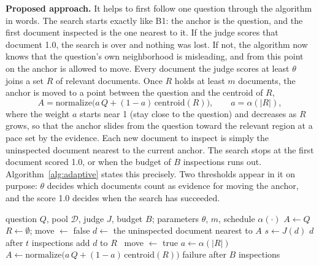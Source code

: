 \documentclass[12pt,a4paper]{article}
\begin{document}
\textbf{Proposed approach.} It helps to first follow one question through the algorithm in words. The search starts exactly like B1: the anchor is the question, and the first document inspected is the one nearest to it. If the judge scores that document 1.0, the search is over and nothing was lost. If not, the algorithm now knows that the question's own neighborhood is misleading, and from this point on the anchor is allowed to move. Every document the judge scores at least $\theta$ joins a set $R$ of relevant documents. Once $R$ holds at least $m$ documents, the anchor is moved to a point between the question and the centroid of $R$,
\begin{equation}
  A = \mathrm{normalize}\bigl(a\,Q + (1-a)\,\mathrm{centroid}(R)\bigr), \qquad a = \alpha(|R|),
  \label{eq:anchor}
\end{equation}
where the weight $a$ starts near 1 (stay close to the question) and decreases as $R$ grows, so that the anchor slides from the question toward the relevant region at a pace set by the evidence. Each new document to inspect is simply the uninspected document nearest to the current anchor. The search stops at the first document scored 1.0, or when the budget of $B$ inspections runs out. Algorithm~\ref{alg:adaptive} states this precisely. Two thresholds appear in it on purpose: $\theta$ decides which documents count as evidence for moving the anchor, and the score 1.0 decides when the search has succeeded.

\begin{algorithm}[H]
\caption{Iterative geometry-guided anchoring (Phase 4)}
\label{alg:adaptive}
\begin{algorithmic}[1]
\Require question $Q$, pool $\mathcal{D}$, judge $J$, budget $B$; parameters $\theta$, $m$, schedule $\alpha(\cdot)$
\State $A \gets Q$ 
\State $R \gets \emptyset$;\; move $\gets$ false
  \State $d \gets$ the uninspected document nearest to $A$
  \State $s \gets J(d)$ 
   \Return $d$ after $t$ inspections  \EndIf
   add $d$ to $R$ 
  \Else\ move $\gets$ true 
  \EndIf
    \State $a \gets \alpha(|R|)$ 
    \State $A \gets \mathrm{normalize}\bigl(a\,Q + (1-a)\,\mathrm{centroid}(R)\bigr)$ 
  \EndIf
\EndFor
\State \Return failure after $B$ inspections
\end{algorithmic}
\end{algorithm}
\end{document}
